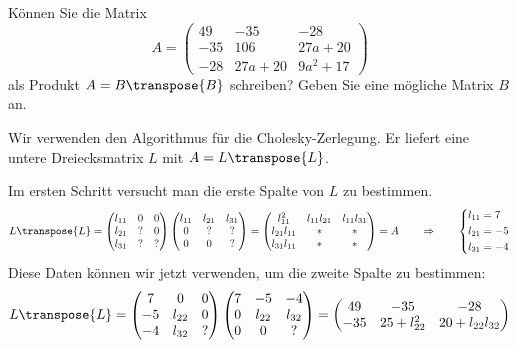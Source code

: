 Können Sie die Matrix
\[
A=\begin{pmatrix}
49& -35&-28\\
-35&106&27a + 20\\
-28&27a + 20&9a^2 + 17
\end{pmatrix}
\]
als Produkt $A=B\transpose{B}$ schreiben? Geben Sie eine mögliche Matrix $B$ an.


\begin{loesung}
Wir verwenden den Algorithmus für die Cholesky-Zerlegung. Er liefert eine 
untere Dreiecksmatrix $L$ mit $A = L\transpose{L}$.

Im ersten Schritt versucht man die erste Spalte von $L$ zu bestimmen.
\[
L\transpose{L}=
\begin{pmatrix}
l_{11}&  0&  0\\
l_{21}&  ?&  0\\
l_{31}&  ?&  ?
\end{pmatrix}
\begin{pmatrix}
l_{11}&l_{21}&l_{31}\\
     0&     ?&     ?\\
     0&     0&     ?
\end{pmatrix}
=
\begin{pmatrix}
    l_{11}^2&l_{11}l_{21}&l_{11}l_{31}\\
l_{21}l_{11}&           *&           *\\
l_{31}l_{11}&           *&           *
\end{pmatrix}
=
A
\qquad\Rightarrow\qquad
\left\{
\begin{aligned}
l_{11}&=7\\
l_{21}&=-5\\
l_{31}&=-4
\end{aligned}
\right.
\]
Diese Daten können wir jetzt verwenden, um die zweite Spalte zu bestimmen:
\[
L\transpose{L}
=
\begin{pmatrix}
7&     0&0\\
-5&l_{22}&0\\
-4&l_{32}&?
\end{pmatrix}
\begin{pmatrix}
7&    -5&    -4\\
0&l_{22}&l_{32}\\
0&     0&?
\end{pmatrix}
=
\begin{pmatrix}
49&    -35&    -28\\
-35& 25+l_{22}^2  & 20+l_{22}l_{32}\\

\end{pmatrix}\]
\end{loesung}
